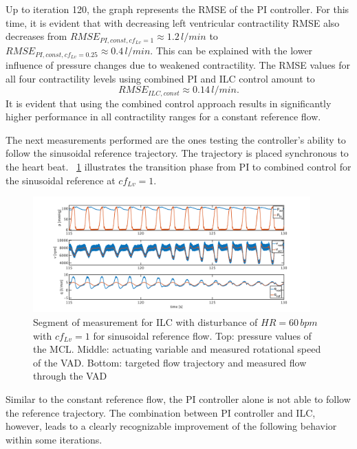 Up to iteration 120, the graph represents the RMSE of the PI controller. For this time, it is evident that with decreasing left ventricular contractility RMSE also decreases from $RMSE_{PI,const,cf_{Lv}=1}\approx 1.2\, l/min$ to $RMSE_{PI,const,cf_{Lv}=0.25}\approx 0.4\, l/min$. This can be explained with the lower influence of pressure changes due to weakened contractility. The RMSE values for all four contractility levels using combined PI and ILC control amount to
\begin{equation}
  RMSE_{ILC,const}\approx0.14\,l/min.
\end{equation}
It is evident that using the combined control approach results in significantly higher performance in all contractility ranges for a constant reference flow.

The next measurements performed are the ones testing the controller's ability to follow the sinusoidal reference trajectory. The trajectory is placed synchronous to the heart beat. \figurename~\ref{fig:pi_to_ilc_dist_sine_cf1} illustrates the transition phase from PI to combined control for the sinusoidal reference at $cf_{Lv}=1$.
\begin{figure}[ht!]
  \centering
  \includegraphics[width=0.95\textwidth]{images/chapt_5/ILC/pi_to_ilc_dist_sine_cf1.pdf}
  \caption[Segment of measurement for ILC with disturbance of $HR=60\,bpm$ with $cf_{Lv}=1$ for sinusoidal reference flow]{Segment of measurement for ILC with disturbance of $HR=60\,bpm$ with $cf_{Lv}=1$ for sinusoidal reference flow. Top:  pressure values of the MCL. Middle: actuating variable and measured rotational speed of the VAD. Bottom: targeted flow trajectory and measured flow through the VAD}
  \label{fig:pi_to_ilc_dist_sine_cf1}
\end{figure}
Similar to the constant reference flow, the PI controller alone is not able to follow the reference trajectory. The combination between PI controller and ILC, however, leads to a clearly recognizable improvement of the following behavior within some iterations.

